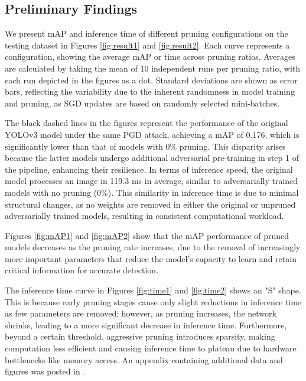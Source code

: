 \documentclass[10pt]{cai}
\begin{document}
\subsection{Preliminary Findings}
We present mAP and inference time of different pruning configurations on the testing dataset in Figures \ref{fig:result1} and \ref{fig:result2}. Each curve represents a configuration, showing the average mAP or time across pruning ratios. Averages are calculated by taking the mean of 10 independent runs per pruning ratio, with each run depicted in the figures as a dot. Standard deviations are shown as error bars, reflecting the variability due to the inherent randomness in model training and pruning, as SGD updates are based on randomly selected mini-batches.

The black dashed lines in the figures represent the performance of the original YOLOv3 model under the same PGD attack, achieving a mAP of 0.176, which is significantly lower than that of models with 0\% pruning. This disparity arises because the latter models undergo additional adversarial pre-training in step 1 of the pipeline, enhancing their resilience. In terms of inference speed, the original model processes an image in 119.3 ms in average, similar to adversarially trained models with no pruning (0\%). This similarity in inference time is due to minimal structural changes, as no weights are removed in either the original or unpruned adversarially trained models, resulting in consistent computational workload.

Figures \ref{fig:mAP1} and \ref{fig:mAP2} show that the mAP performance of pruned models decreases as the pruning rate increases, due to the removal of increasingly more important parameters that reduce the model's capacity to learn and retain critical information for accurate detection. 

The inference time curve in Figures \ref{fig:time1} and \ref{fig:time2} shows an "S" shape. This is because early pruning stages cause only slight reductions in inference time as few parameters are removed; however, as pruning increases, the network shrinks, leading to a more significant decrease in inference time. Furthermore, beyond a certain threshold, aggressive pruning introduces sparsity, making computation less efficient and causing inference time to plateau due to hardware bottlenecks like memory access. An appendix containing additional data and figures was posted in  \cite{MyAppendix}.
\end{document}
